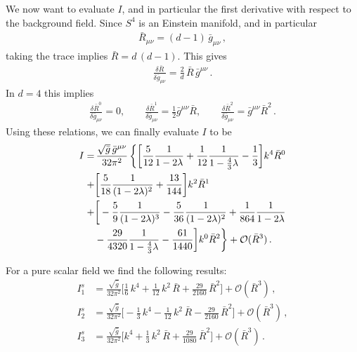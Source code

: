 \documentclass[11pt]{book} %
\begin{document}
{We now want to evaluate $I$, and in particular the first derivative
with respect to the background field.
Since $S^4$ is an Einstein manifold, and in particular
\begin{align}
  \bar R_{\mu\nu} = (d-1) \, \bar g_{\mu\nu} \,,
\end{align}
taking the trace implies $\bar R = d \, (d-1)$. This gives
\begin{align}
  \frac{\delta \bar R}{\delta \bar g_{\mu\nu}} = \frac 2d \, \bar R \, \bar g^{\mu\nu} \,.
\end{align}
In $d=4$ this implies
\begin{align}
  \frac{\delta \bar R^0}{\delta \bar g_{\mu\nu}} = 0, \quad \quad
  \frac{\delta \bar R^1}{\delta \bar g_{\mu\nu}} = \frac 12 \bar g^{\mu\nu} \bar R, \quad \quad
  \frac{\delta \bar R^2}{\delta \bar g_{\mu\nu}} = \bar g^{\mu\nu} \bar R^2 \,.
\end{align}
Using these relations, we can finally evaluate $I$ to be
\begin{align}
  \notag
  I =& \, \frac{ \sqrt{\bar g} \, \bar g^{\mu\nu} }{ 32 \pi^2 } \,
  \bigg\lbrace
    \bigg[
    \frac 5{12} \frac{1}{1 - 2 \lambda}
    + \frac 1{12} \frac{1}{1 - \frac 43 \lambda}
    - \frac{1}{3}
    \bigg] k^4 \bar R^0 \\ \notag
    + &\bigg[
        \frac {5}{18} \frac{1}{(1 - 2 \lambda)^2}
      + \frac {13}{144}
    \bigg] k^2 \bar R^1 \\ \notag
    + &\bigg[
      - \frac {5}{9} \frac{1}{(1 - 2 \lambda)^3}
      - \frac {5}{36} \frac{1}{(1 - 2 \lambda)^2}
      + \frac {1}{864} \frac{1}{1 - 2 \lambda} \\
      &- \frac {29}{4320} \frac{1}{1 - \frac 43 \lambda}
      - \frac {61}{1440}
    \bigg] k^0 \bar R^2
  \bigg\rbrace
    + \mathcal O (\bar R^3) \,.
\end{align}

For a pure scalar field we find the following results:
\begin{align}
  I_1^s
  & = \frac{ \sqrt \bar g }{ 32 \pi^2 }
  \bigg[
      \frac{1}{6} \, k^4
    + \frac{1}{12} \, k^2 \, \bar R
    + \frac{29}{2160} \, \bar R^2
  \bigg]
  + \mathcal O (\bar R^3) \,, \\
  I_2^s
  & = \frac{ \sqrt \bar g }{ 32 \pi^2 }
  \bigg[
    - \frac{1}{3} \, k^4
    - \frac{1}{12} \, k^2 \, \bar R
    - \frac{29}{2160} \, \bar R^2
  \bigg]
  + \mathcal O (\bar R^3) \,, \\
  I_3^s
  & = \frac{ \sqrt \bar g }{ 32 \pi^2 }
  \bigg[
  k^4
  + \frac{1}{3} \, k^2 \, \bar R
  + \frac{29}{1080} \, \bar R^2
  \bigg]
  + \mathcal O (\bar R^3) \,.
\end{align}

}
\end{document}
